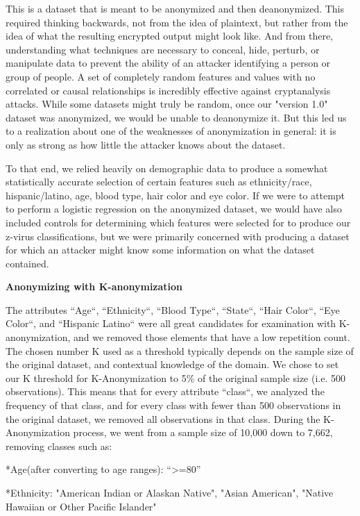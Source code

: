 \documentclass[10pt,journal,compsoc]{IEEEtran}
\begin{document}
This is a dataset that is meant to be anonymized and then deanonymized. This required thinking backwards, not from the idea of plaintext, but rather from the idea of what the resulting encrypted output might look like. And from there, understanding what techniques are necessary to conceal, hide, perturb, or manipulate data to prevent the ability of an attacker identifying a person or group of people. A set of completely random features and values with no correlated or causal relationships is incredibly effective against cryptanalysis attacks. While some datasets might truly be random, once our "version 1.0" dataset was anonymized, we would be unable to deanonymize it. But this led us to a realization about one of the weaknesses of anonymization in general: it is only as strong as how little the attacker knows about the dataset.

To that end, we relied heavily on demographic data to produce a somewhat statistically accurate selection of certain features such as ethnicity/race, hispanic/latino, age, blood type, hair color and eye color. If we were to attempt to perform a logistic regression on the anonymized dataset, we would have also included controls for determining which features were selected for to produce our z-virus classifications, but we were primarily concerned with producing a dataset for which an attacker might know some information on what the dataset contained.\linebreak


\noindent \textbf{Anonymizing with K-anonymization}

The attributes ``Age``, ``Ethnicity``, ``Blood Type``, ``State``, ``Hair Color``, ``Eye Color``, and ``Hispanic Latino`` were all great candidates for examination with K-anonymization, and we removed those elements that have a low repetition count.  The chosen number K used as a threshold typically depends on the sample size of the original dataset, and contextual knowledge of the domain. We chose to set our K threshold for K-Anonymization to 5\% of the original sample size (i.e. 500 observations). This means that for every attribute ``class``, we analyzed the frequency of that class, and for every class with fewer than 500 observations in the original dataset, we removed all observations in that class.  During the K-Anonymization process, we went from a sample size of 10,000 down to 7,662, removing classes such as:

		*Age(after converting to age ranges): “>=80”
		
		*Ethnicity: "American Indian or Alaskan Native", "Asian American", "Native Hawaiian or Other Pacific Islander"
		
\end{document}

